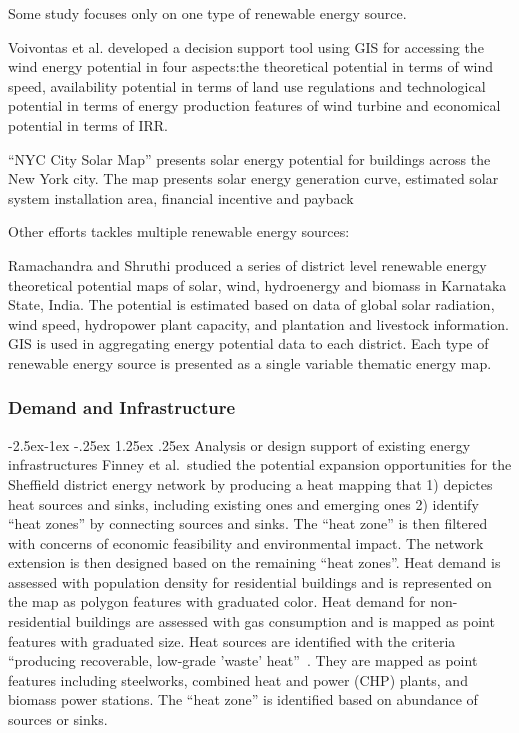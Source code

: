 \documentclass[hidelinks,12pt]{article}
\makeatletter
\renewcommand\paragraph{\@startsection{paragraph}{4}{\z@}%
            {-2.5ex\@plus -1ex \@minus -.25ex}%
            {1.25ex \@plus .25ex}%
            {\normalfont\normalsize\bfseries}}
\makeatother
\begin{document}
Some study focuses only on one type of renewable energy source.

Voivontas et al. developed a decision support tool using GIS for
accessing the wind energy potential in four aspects:the theoretical
potential in terms of wind speed, availability potential in terms of
land use regulations and technological potential in terms of energy
production features of wind turbine and economical potential in terms
of IRR. 

``NYC City Solar Map'' presents solar energy potential for
buildings across the New York city. The map presents solar energy
generation curve, estimated solar system installation area, financial
incentive and payback~\cite{NYCSolarMap}

Other efforts tackles multiple renewable energy sources:

Ramachandra and Shruthi produced a series of district level renewable
energy theoretical potential maps of solar, wind, hydroenergy and
biomass in Karnataka State, India. The potential is estimated based on
data of global solar radiation, wind speed, hydropower plant capacity,
and plantation and livestock information. GIS is used in aggregating
energy potential data to each district. Each type of renewable energy
source is presented as a single variable thematic energy map.

\subsubsection{Demand and Infrastructure}
\paragraph{Analysis or design support of existing energy
  infrastructures}\label{infra}
Finney et al.\ studied the potential expansion opportunities for the
Sheffield district energy network by producing a heat mapping that 1)
depictes heat sources and sinks, including existing ones and emerging
ones 2) identify ``heat zones'' by connecting sources and sinks. The
``heat zone'' is then filtered with concerns of economic feasibility
and environmental impact. The network extension is then designed
based on the remaining ``heat zones''. Heat demand is assessed with
population density for residential buildings and is represented on the
map as polygon features with graduated color. Heat demand for
non-residential buildings are assessed with gas consumption and is
mapped as point features with graduated size. Heat sources are
identified with the criteria ``producing recoverable, low-grade
'waste' heat''~\cite{Finney2012165}. They are mapped as point features
including steelworks, combined heat and power (CHP) plants, and
biomass power stations. The ``heat zone'' is identified based on
abundance of sources or sinks.
\end{document}
